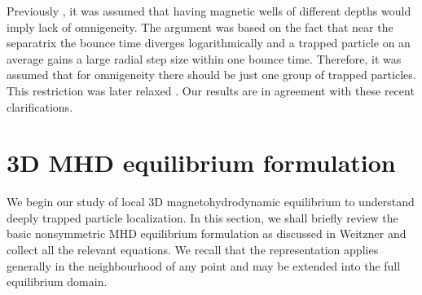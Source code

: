 \documentclass[aip,pop,reprint]{revtex4-1}
\begin{document}
Previously \cite{caryshasharina1997omnigenity,landremancatto2012omnigenity}, it was assumed that having magnetic wells of different depths would imply lack of omnigeneity. The argument was based on the fact that near the separatrix the bounce time diverges logarithmically and a trapped particle on an average gains a large radial step size within one bounce time. Therefore, it was assumed that for omnigeneity there should be just one group of trapped particles. This restriction was later relaxed \cite{parraLandreman2015lessconstrained}. Our results are in agreement with these recent\cite{parraLandreman2015lessconstrained} clarifications. 

 
\section{3D MHD equilibrium formulation}
\label{sec:3Deqb}

We begin our study of local 3D magnetohydrodynamic equilibrium to understand deeply trapped particle localization. In this section, we shall briefly review the basic nonsymmetric MHD equilibrium formulation as discussed in Weitzner \cite{weitzner2016expansions} and collect all the relevant equations. We recall that the representation applies generally in the neighbourhood of any point and may be extended into the full equilibrium domain.
\end{document}
